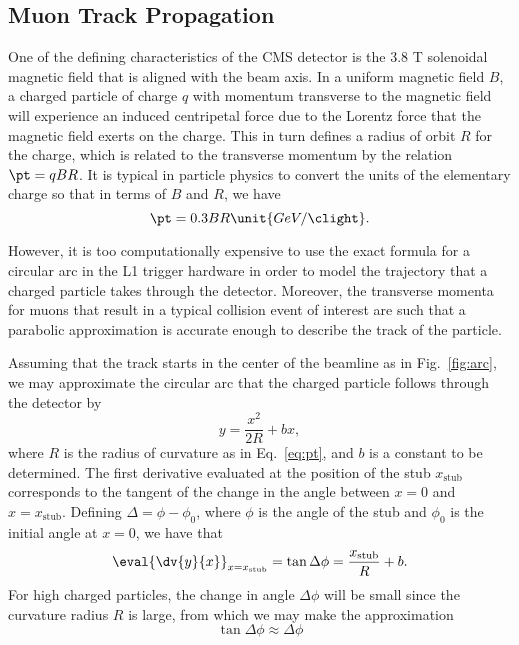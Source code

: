 \subsection{Muon Track Propagation}
\label{subsec:prop}

One of the defining characteristics of the CMS detector is the 3.8 T solenoidal magnetic field that is aligned with the beam axis.
In a uniform magnetic field $B$, a charged particle of charge $q$ with momentum transverse to the magnetic field \pt will experience an induced centripetal force due to the Lorentz force that the magnetic field exerts on the charge.
This in turn defines a radius of orbit $R$ for the charge, which is related to the transverse momentum \pt by the relation $\pt=qBR$. It is typical in particle physics to convert the units of the elementary charge so that in terms of $B$ and $R$, we have
\begin{equation}\label{eq:pt}
  \pt=0.3BR\unit{GeV/\clight}.
\end{equation}

However, it is too computationally expensive to use the exact formula for a circular arc in the L1 trigger hardware in order to model the trajectory that a charged particle takes through the detector.
Moreover, the transverse momenta for muons that result in a typical collision event of interest are such that a parabolic approximation is accurate enough to describe the track of the particle.

Assuming that the track starts in the center of the beamline as in Fig.~\ref{fig:arc}, we may approximate the circular arc that the charged particle follows through the detector by
\begin{equation}
  y=\frac{x^2}{2R}+bx,
\end{equation}
where $R$ is the radius of curvature as in Eq.~\ref{eq:pt}, and $b$ is a constant to be determined.
The first derivative evaluated at the position of the stub $x_\mathrm{stub}$ corresponds to the tangent of the change in the angle between $x=0$ and $x=x_\mathrm{stub}$.
Defining $\Delta=\phi-\phi_0$, where $\phi$ is the angle of the stub and $\phi_0$ is the initial angle at $x=0$, we have that
\begin{equation}
  \eval{\dv{y}{x}}_{x=x_\mathrm{stub}}=\tan\Delta\phi=\frac{x_\mathrm{stub}}{R}+b.
\end{equation}
For high \pt charged particles, the change in angle $\Delta\phi$ will be small since the curvature radius $R$ is large, from which we may make the approximation
\begin{equation}
  \tan\Delta\phi\approx\Delta\phi
\end{equation}

